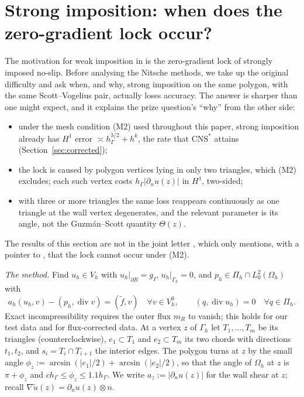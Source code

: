 \documentclass[pdflatex,sn-mathphys-num]{sn-jnl}
\theoremstyle{thmstyleone}
\theoremstyle{thmstylethree}
\newcommand{\hG}{h_\Gamma}
\newcommand{\Gh}{\Gamma_h}
\newcommand{\Oh}{\Omega_h}
\newcommand{\Vh}{V_h}
\newcommand{\VO}{V_h^0}
\newcommand{\Pih}{\Pi_h}
\newcommand{\gI}{g_I}
\newcommand{\dn}{\partial_n}
\newcommand{\ut}{\tilde u}
\newcommand{\ft}{\tilde f}
\newcommand{\CNS}{\mathrm{CNS}^\ast}
\renewcommand{\div}{\operatorname{div}}
\begin{document}
\section{Strong imposition: when does the zero-gradient lock occur?}\label{sec:strong}

The motivation for weak imposition in \cite{ScottPrize,GjerdeScott2024} is the zero-gradient lock of strongly imposed no-slip. Before analysing the Nitsche methods, we take up the original difficulty and ask when, and why, strong imposition on the same polygon, with the same Scott--Vogelius pair, actually loses accuracy. The answer is sharper than one might expect, and it explains the prize question's ``why'' from the other side:
\begin{itemize}
\item under the mesh condition (M2) used throughout this paper, strong imposition already has $H^1$ error $\asymp\hG^{3/2}+h^k$, the rate that $\CNS$ attains (Section~\ref{sec:corrected});
\item the lock is caused by polygon vertices lying in only two triangles, which (M2) excludes; each such vertex costs $\hG|\dn u(z)|$ in $H^1$, two-sided;
\item with three or more triangles the same loss reappears continuously as one triangle at the wall vertex degenerates, and the relevant parameter is its angle, not the Guzm\'an--Scott quantity $\Theta(z)$.
\end{itemize}

The results of this section are not in the joint letter \cite{CavalcantePadhiLetter}, which only mentions, with a pointer to \cite{PadhiExt}, that the lock cannot occur under (M2).

\emph{The method.} Find $u_h\in\Vh$ with $u_h|_{\partial R}=\gI$, $u_h|_{\Gh}=0$, and $p_h\in\Pih\cap L^2_0(\Oh)$ with
\[
a_h(u_h,v)-(p_h,\div v)=(\ft,v)\quad\forall v\in\VO,\qquad (q,\div u_h)=0\quad\forall q\in\Pih .
\]
Exact incompressibility requires the outer flux $m_R$ to vanish; this holds for our test data and for flux-corrected data. At a vertex $z$ of $\Gh$ let $T_1,\dots,T_m$ be its triangles (counterclockwise), $e_1\subset T_1$ and $e_2\subset T_m$ its two chords with directions $t_1,t_2$, and $s_i=T_i\cap T_{i+1}$ the interior edges. The polygon turns at $z$ by the small angle $\phi_z:=\arcsin(|e_1|/2)+\arcsin(|e_2|/2)$, so that the angle of $\Oh$ at $z$ is $\pi+\phi_z$ and $c\hG\le\phi_z\le1.1\hG$. We write $a_z:=|\dn u(z)|$ for the wall shear at $z$; recall $\nabla\ut(z)=\dn u(z)\otimes n$.
\end{document}

